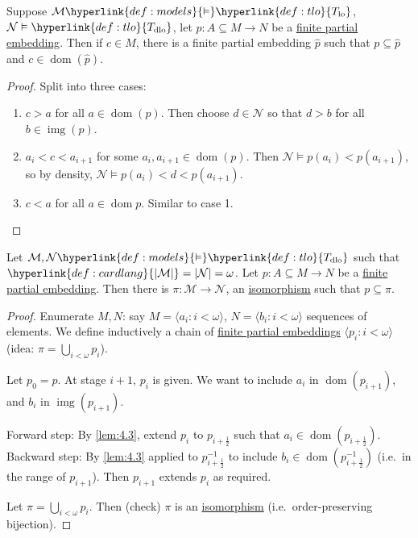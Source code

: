 \documentclass{article}
\let\models\vDash
\DeclareMathOperator{\dom}{dom}
\DeclareMathOperator{\img}{img}
\begin{document}
\begin{nlemma}\label{lem:4.3}
  Suppose $\mathcal{M} \hyperlink{def:models}{\models} \hyperlink{def:tlo}{T_{\text{lo}}}$, $\mathcal{N} \models \hyperlink{def:tlo}{T_{\text{dlo}}}$, let $p: A \subseteq M \to N$ be a \hyperlink{def:pe}{finite partial embedding}.
  Then if $c \in M$, there is a finite partial embedding $\hat{p}$ such that $p \subseteq \hat{p}$ and $c \in \dom(\hat{p})$.
\end{nlemma}
\begin{proof}
  Split into three cases:
  \begin{enumerate}[label=\arabic*.]
    \item $c > a$ for all $a \in \dom(p)$. Then choose $d \in \mathcal{N}$ so that $d > b$ for all $b \in \img(p)$.
    \item $a_i < c < a_{i+1}$ for some $a_i, a_{i+1} \in \dom(p)$.
      Then $\mathcal{N} \models p(a_i) < p(a_{i+1})$, so by density, $\mathcal{N} \models p(a_i) < d < p(a_{i+1})$.
     \item $c<a$ for all $a \in \dom p$. Similar to case 1. \qedhere
  \end{enumerate}
\end{proof}
\begin{nthm}\label{thm:4.4}
  Let $\mathcal{M}, \mathcal{N} \hyperlink{def:models}{\models} \hyperlink{def:tlo}{T_{\text{dlo}}}$ such that $\hyperlink{def:cardlang}{|\mathcal{M}|} = |\mathcal{N}| = \omega$.
  Let $p: A \subseteq M \to N$ be a \hyperlink{def:pe}{finite partial embedding}.
  Then there is $\pi: \mathcal{M} \to \mathcal{N}$, an \hyperlink{def:iso}{isomorphism} such that $p \subseteq \pi$.
\end{nthm}
\begin{proof}
  Enumerate $M, N$:
  say $M = \langle a_i : i < \omega \rangle$, $N = \langle b_i : i < \omega \rangle$ sequences of elements.
  We define inductively a chain of \hyperlink{def:pe}{finite partial embeddings} $\langle p_i : i < \omega \rangle$ (idea: $\pi = \bigcup_{i < \omega} p_i$).

  Let $p_0 = p$.
  At stage $i+1$, $p_i$ is given. We want to include $a_i$ in $\dom(p_{i+1})$, and $b_i$ in $\operatorname{img}(p_{i+1})$.

  Forward step: By \cref{lem:4.3}, extend $p_i$ to $p_{i+\frac{1}{2}}$ such that $a_i \in \dom(p_{i + \frac{1}{2}})$.
  Backward step: By \cref{lem:4.3} applied to $p_{i+\frac{1}{2}}^{-1}$ to include $b_i \in \dom(p_{i+\frac{1}{2}}^{-1})$ (i.e.\ in the range of $p_{i+1}$).
Then $p_{i+1}$ extends $p_i$ as required.

  Let $\pi = \bigcup_{i < \omega} p_i$. Then (check) $\pi$ is an \hyperlink{def:iso}{isomorphism} (i.e.\ order-preserving bijection).
\end{proof}
\end{document}
